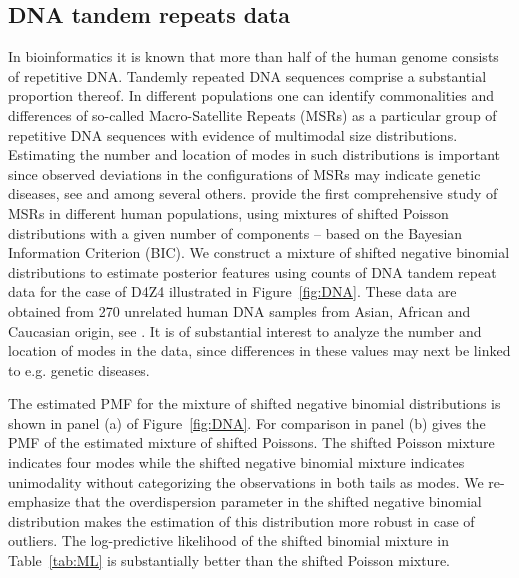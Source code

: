 \documentclass[11pt]{article}
\begin{document}

\subsection{DNA tandem repeats data}
In bioinformatics it is known that more than half of the human genome consists of repetitive DNA. Tandemly repeated DNA sequences comprise a substantial proportion thereof. In different populations one can identify commonalities and differences of so-called Macro-Satellite Repeats (MSRs) as a particular group of repetitive DNA sequences with evidence of multimodal size distributions. Estimating the number and location of modes in such distributions is important since observed deviations in the configurations of MSRs may indicate genetic diseases, see \cite{Bruceetal2009} and \cite{Balogetal2012} among several others. \cite{DNA_leiden} provide the first comprehensive study of MSRs in different human populations, using mixtures of shifted Poisson distributions with a given number of components -- based on the Bayesian Information Criterion (BIC). We construct a mixture of shifted negative binomial distributions to estimate posterior features using counts of DNA tandem repeat data for the case of D4Z4 illustrated in Figure~\ref{fig:DNA}. These data are obtained from 270 unrelated human DNA samples from Asian, African and Caucasian origin, see \cite{DNA_leiden}. It is of substantial interest to analyze the number and location of modes in the data, since differences in these values may next be linked to e.g. genetic diseases.


The estimated PMF for the mixture of shifted negative binomial distributions is shown in panel (a) of Figure~\ref{fig:DNA}. For comparison in panel (b) gives the PMF of the estimated mixture of shifted Poissons. The shifted Poisson mixture indicates four modes while the shifted negative binomial mixture indicates unimodality without categorizing the observations in both tails as modes. We re-emphasize that the overdispersion parameter in the shifted negative binomial distribution makes the estimation of this
distribution more robust in case of outliers. The  log-predictive likelihood of the shifted binomial mixture in Table~\ref{tab:ML} is substantially better than the shifted Poisson mixture. 



\end{document}
